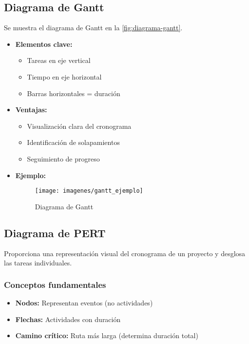 \subsection{Diagrama de Gantt}
\label{subsec:gantt}
Se muestra el diagrama de Gantt en la \autoref{fig:diagrama-gantt}.
\begin{itemize}
    \item \textbf{Elementos clave:}
    \begin{itemize}
        \item Tareas en eje vertical
        \item Tiempo en eje horizontal
        \item Barras horizontales = duración
    \end{itemize}
    \item \textbf{Ventajas:}
    \begin{itemize}
        \item Visualización clara del cronograma
        \item Identificación de solapamientos
        \item Seguimiento de progreso
    \end{itemize}
    \item \textbf{Ejemplo:}
    \begin{figure}[h]
        \texttt{[image: imagenes/gantt\_ejemplo]}
        \caption{Diagrama de Gantt}
        \label{fig:diagrama-gantt}
    \end{figure}
\end{itemize}

\subsection{Diagrama de PERT}
\label{subsec:pert}

Proporciona una representación visual del cronograma de un proyecto y desglosa las tareas individuales.

\subsubsection{Conceptos fundamentales}

\begin{itemize}
    \item \textbf{Nodos:} Representan eventos (no actividades)
    \item \textbf{Flechas:} Actividades con duración
    \item \textbf{Camino crítico:} Ruta más larga (determina duración total)
\end{itemize}

